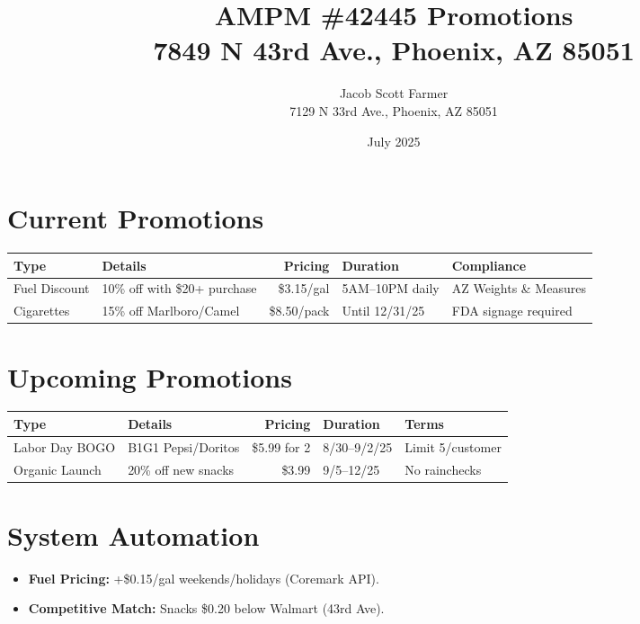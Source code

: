 \documentclass{article}
\title{\textbf{AMPM \#42445 Promotions} \\ \small 7849 N 43rd Ave., Phoenix, AZ 85051}
\author{Jacob Scott Farmer \\ 7129 N 33rd Ave., Phoenix, AZ 85051}
\date{July 2025}
\begin{document}
\maketitle

\section*{Current Promotions}
\begin{tabularx}{\textwidth}{|l|X|r|l|l|}
\hline
\textbf{Type} & \textbf{Details} & \textbf{Pricing} & \textbf{Duration} & \textbf{Compliance} \\
\hline
Fuel Discount & 10\% off with \$20+ purchase & \$3.15/gal & 5AM–10PM daily & AZ Weights \& Measures \\
\hline
Cigarettes & 15\% off Marlboro/Camel & \$8.50/pack & Until 12/31/25 & FDA signage required \\
\hline
\end{tabularx}

\section*{Upcoming Promotions}
\begin{tabularx}{\textwidth}{|l|X|r|l|X|}
\hline
\textbf{Type} & \textbf{Details} & \textbf{Pricing} & \textbf{Duration} & \textbf{Terms} \\
\hline
Labor Day BOGO & B1G1 Pepsi/Doritos & \$5.99 for 2 & 8/30–9/2/25 & Limit 5/customer \\
\hline
Organic Launch & 20\% off new snacks & \$3.99 & 9/5–12/25 & No rainchecks \\
\hline
\end{tabularx}

\section*{System Automation}
\begin{itemize}
    \item \textbf{Fuel Pricing:} +\$0.15/gal weekends/holidays (Coremark API).
    \item \textbf{Competitive Match:} Snacks \$0.20 below Walmart (43rd Ave).
\end{itemize}
\end{document}
